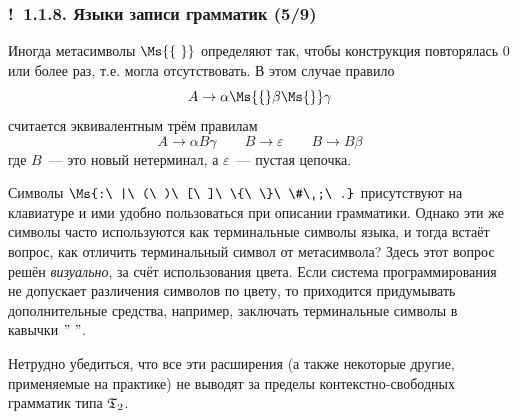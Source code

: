 \documentclass[mathserif,12pt,aspectratio=169]{beamer}
\def\emразделенной{\em разделенной}
\def\em#1{\it\color{blue}#1}
\def\Ok{{\color{green}\textbf{!}\ }}
\begin{document}
\begin{frame}
\frametitle{\Ok 1.1.8. Языки записи грамматик (5/9)}

\vspace{-2pt}
Иногда метасимволы $\Ms{\{\ \}}$ определяют так, чтобы конструкция
повторялась 0 или более раз, т.е. могла отсутствовать. В этом
случае правило
$$
A\rightarrow \alpha\Ms{\{}\beta\Ms{\}}\gamma
$$
считается эквивалентным трём правилам
$$
A\rightarrow \alpha B\gamma 
\qquad B\rightarrow\varepsilon 
\qquad B\rightarrow B \beta
$$
где $B$~--- это новый нетерминал, а $\varepsilon$~--- пустая
цепочка.

\begin{remark} Символы 
$\Ms{:\ |\ (\ )\ [\ ]\ \{\ \}\ \#\ ;\ .}$
присутствуют на клавиатуре и ими 
удобно пользоваться при описании 
грамматики. Однако эти же символы 
часто используются как терминальные 
символы языка, 
и тогда встаёт вопрос,
как отличить терминальный символ
от метасимвола? Здесь этот вопрос
решён {\em визуально}, 
за счёт использования цвета.
Если система программирования
не допускает различения символов по цвету,
то приходится придумывать 
дополнительные средства, например, заключать
терминальные символы в кавычки $"\ "$.
\end{remark}

Нетрудно убедиться, что все эти расширения (а также некоторые
другие, применяемые на практике) не выводят за пределы
контекстно-свободных грамматик типа $\frak{T}_2$.

\end{frame}
\end{document}
